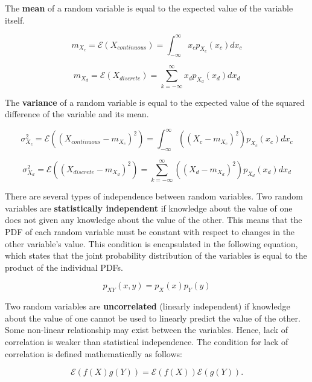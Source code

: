 The \textbf{mean} of a random variable is equal to the expected value of the variable itself.

\begin{equation}
	m_{X_c} = \mathcal{E}(X_{continuous}) = \int_{-\infty}^{\infty} x_c p_{X_c}(x_c)dx_c
\end{equation}

\begin{equation}
	m_{X_d} = \mathcal{E}(X_{discrete}) = \sum_{k = -\infty}^{\infty} x_d p_{X_d}(x_d)dx_d
\end{equation}

The \textbf{variance} of a random variable is equal to the expected value of the squared difference of the variable and its mean.

\begin{equation}
	\sigma_{X_c}^2 = \mathcal{E}((X_{continuous} - m_{X_c})^2) = \int_{-\infty}^{\infty} ((X_c - m_{X_c})^2) p_{X_c}(x_c)dx_c
\end{equation}

\begin{equation}
	\sigma_{X_d}^2 = \mathcal{E}((X_{discrete} - m_{X_d})^2) = \sum_{k = -\infty}^{\infty} ((X_d - m_{X_d})^2) p_{X_d}(x_d)dx_d
\end{equation}

There are several types of independence between random variables. Two random variables are \textbf{statistically independent} if knowledge about the value of one does not given any knowledge about the value of the other. This means that the PDF of each random variable must be constant with respect to changes in the other variable's value. This condition is encapsulated in the following equation, which states that the joint probability distribution of the variables is equal to the product of the individual PDFs.

\begin{equation}
	p_{XY}(x,y) = p_X(x)p_Y(y)
\end{equation}

 Two random variables are \textbf{uncorrelated} (linearly independent) if knowledge about the value of one cannot be used to linearly predict the value of the other. Some non-linear relationship may exist between the variables. Hence, lack of correlation is weaker than statistical independence. The condition for lack of correlation is defined mathematically as follows:
 
 \begin{equation}
 	\mathcal{E}(f(X)g(Y)) = \mathcal{E}(f(X)) \mathcal{E}(g(Y)).
 \end{equation}

